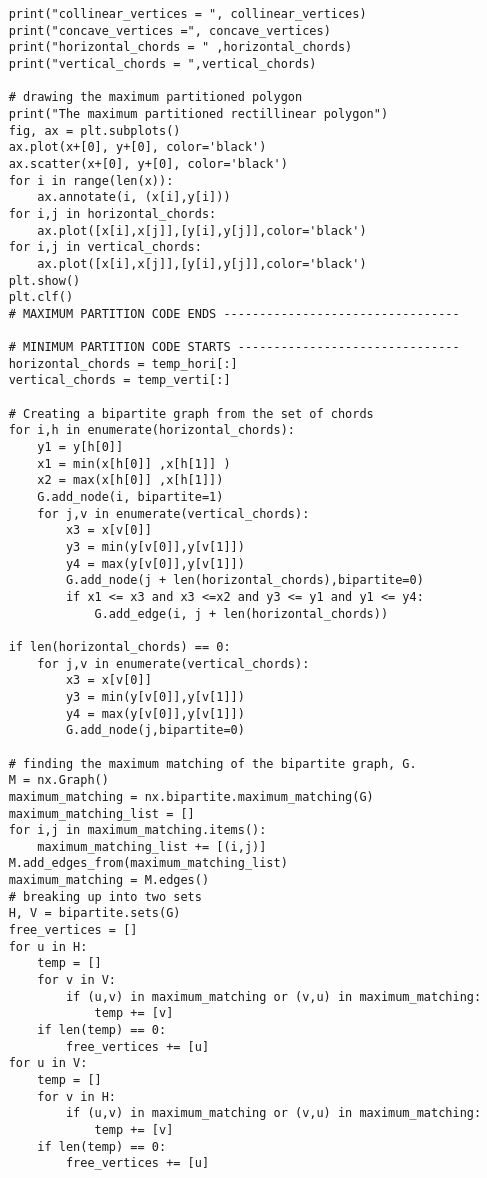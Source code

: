 \begin{lstlisting}
    print("collinear_vertices = ", collinear_vertices)
    print("concave_vertices =", concave_vertices)
    print("horizontal_chords = " ,horizontal_chords)
    print("vertical_chords = ",vertical_chords)
    
    # drawing the maximum partitioned polygon 
    print("The maximum partitioned rectillinear polygon")
    fig, ax = plt.subplots()
    ax.plot(x+[0], y+[0], color='black')
    ax.scatter(x+[0], y+[0], color='black')
    for i in range(len(x)):
        ax.annotate(i, (x[i],y[i]))
    for i,j in horizontal_chords:
        ax.plot([x[i],x[j]],[y[i],y[j]],color='black')
    for i,j in vertical_chords:
        ax.plot([x[i],x[j]],[y[i],y[j]],color='black')
    plt.show()
    plt.clf()
    # MAXIMUM PARTITION CODE ENDS ---------------------------------

    # MINIMUM PARTITION CODE STARTS -------------------------------
    horizontal_chords = temp_hori[:]
    vertical_chords = temp_verti[:]

    # Creating a bipartite graph from the set of chords
    for i,h in enumerate(horizontal_chords):
        y1 = y[h[0]]
        x1 = min(x[h[0]] ,x[h[1]] )
        x2 = max(x[h[0]] ,x[h[1]])
        G.add_node(i, bipartite=1)
        for j,v in enumerate(vertical_chords):
            x3 = x[v[0]]
            y3 = min(y[v[0]],y[v[1]])
            y4 = max(y[v[0]],y[v[1]])
            G.add_node(j + len(horizontal_chords),bipartite=0)
            if x1 <= x3 and x3 <=x2 and y3 <= y1 and y1 <= y4:    
                G.add_edge(i, j + len(horizontal_chords))
    
    if len(horizontal_chords) == 0:
        for j,v in enumerate(vertical_chords):
            x3 = x[v[0]]
            y3 = min(y[v[0]],y[v[1]])
            y4 = max(y[v[0]],y[v[1]])
            G.add_node(j,bipartite=0)
    
    # finding the maximum matching of the bipartite graph, G.
    M = nx.Graph()
    maximum_matching = nx.bipartite.maximum_matching(G)
    maximum_matching_list = []
    for i,j in maximum_matching.items():
        maximum_matching_list += [(i,j)]
    M.add_edges_from(maximum_matching_list)
    maximum_matching = M.edges()
    # breaking up into two sets
    H, V = bipartite.sets(G)
    free_vertices = []
    for u in H:
        temp = []
        for v in V:
            if (u,v) in maximum_matching or (v,u) in maximum_matching:
                temp += [v]
        if len(temp) == 0:
            free_vertices += [u]
    for u in V:
        temp = []
        for v in H:
            if (u,v) in maximum_matching or (v,u) in maximum_matching:
                temp += [v]
        if len(temp) == 0:
            free_vertices += [u]
            

\end{lstlisting}

